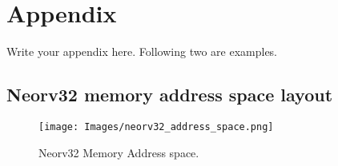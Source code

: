 \chapter{Appendix}

Write your appendix here. Following two are examples. 


\section{Neorv32 memory address space layout}
\label{app:mem_address}
\begin{figure}[h!]
    \centering
    \texttt{[image: Images/neorv32\_address\_space.png]}
    \caption{Neorv32 Memory Address space.}
\end{figure}



